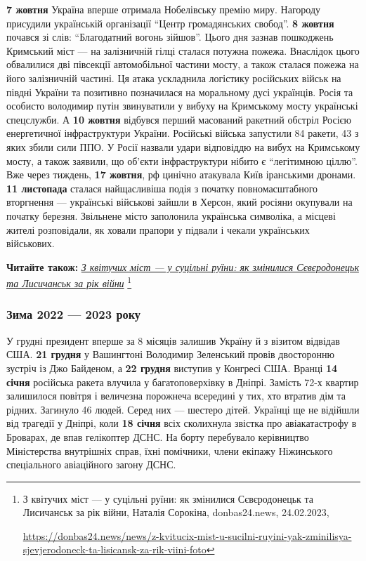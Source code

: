 
\textbf{7 жовтня} Україна вперше отримала Нобелівську премію миру. Нагороду присудили
українській організації \enquote{Центр громадянських свобод}. \textbf{8 жовтня} почався зі слів:
\enquote{Благодатний вогонь зійшов}. Цього дня зазнав пошкоджень Кримський міст — на
залізничній гілці сталася потужна пожежа. Внаслідок цього обвалилися дві
півсекції автомобільної частини мосту, а також сталася пожежа на його
залізничній частині. Ця атака ускладнила логістику російських військ на півдні
України та позитивно позначилася на моральному дусі українців. Росія та
особисто володимир путін звинуватили у вибуху на Кримському мосту українські
спецслужби. А \textbf{10 жовтня} відбувся перший масований ракетний обстріл Росією
енергетичної інфраструктури України. Російські війська запустили 84 ракети, 43
з яких збили сили ППО. У Росії назвали удари відповіддю на вибух на Кримському
мосту, а також заявили, що об'єкти інфраструктури нібито є \enquote{легітимною ціллю}.
Вже через тиждень, \textbf{17 жовтня}, рф цинічно атакувала Київ іранськими дронами. \textbf{11
листопада} сталася найщасливіша подія з початку повномасштабного вторгнення —
українські військові зайшли в Херсон, який росіяни окупували на початку
березня. Звільнене місто заполонила українська символіка, а місцеві жителі
розповідали, як ховали прапори у підвали і чекали українських військових.

\textbf{Читайте також:} \href{https://donbas24.news/news/z-kvitucix-mist-u-sucilni-ruyini-yak-zminilisya-sjevjerodoneck-ta-lisicansk-za-rik-viini-foto}{\emph{З квітучих міст — у суцільні руїни: як змінилися Сєвєродонецьк та Лисичанськ за рік війни}}%
\footnote{З квітучих міст — у суцільні руїни: як змінилися Сєвєродонецьк та Лисичанськ за рік війни, Наталія Сорокіна, donbas24.news, 24.02.2023, \par%
\url{https://donbas24.news/news/z-kvitucix-mist-u-sucilni-ruyini-yak-zminilisya-sjevjerodoneck-ta-lisicansk-za-rik-viini-foto}%
}


\subsubsection{Зима 2022 — 2023 року}

У грудні президент вперше за 8 місяців залишив Україну й з візитом відвідав
США. \textbf{21 грудня} у Вашингтоні Володимир Зеленський провів двосторонню зустріч із
Джо Байденом, а \textbf{22 грудня} виступив у Конгресі США. Вранці \textbf{14 січня} російська
ракета влучила у багатоповерхівку в Дніпрі. Замість 72-х квартир залишилося
повітря і величезна порожнеча всередині у тих, хто втратив дім та рідних.
Загинуло 46 людей. Серед них — шестеро дітей. Українці ще не відійшли від
трагедії у Дніпрі, коли \textbf{18 січня} всіх сколихнула звістка про авіакатастрофу в
Броварах, де впав гелікоптер ДСНС. На борту перебувало керівництво Міністерства
внутрішніх справ, їхні помічники, члени екіпажу Ніжинського спеціального
авіаційного загону ДСНС.

